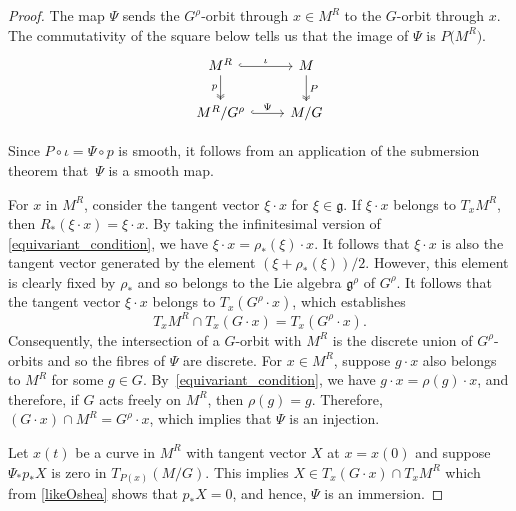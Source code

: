 \documentclass[pdftex]{sigma}
\numberwithin{equation}{section}
\begin{document}
\begin{proof}\samepage
	The map $\Psi$ sends the $G^\rho$-orbit through $x\in M^R$ to the $G$-orbit through $x$. The commutativity of the square below tells us that the image of $\Psi$ is $P\bigl(M^R\bigr)$.
	\begin{equation*}%
			\begin{tikzcd}
				M^R\arrow[r, hook,"\iota"]\arrow[d,two heads,"p"'] & M\arrow[d,two heads, "P"] \\ M^R/G^\rho \arrow[r,hook,"\Psi"] & M/G
			\end{tikzcd}
			\end{equation*}
	
Since $P\circ\iota=\Psi\circ p$ is smooth, it follows from an application of the submersion theorem that~$\Psi$ is a smooth map.
	
For $x$ in $M^R$, consider the tangent vector $\xi\cdot x$ for $\xi\in\mathfrak{g}$. If $\xi\cdot x$ belongs to $T_xM^R$, then $R_*(\xi\cdot x)=\xi\cdot x$. By taking the infinitesimal version of \eqref{equivariant_condition}, we have $\xi\cdot x=\rho_*(\xi)\cdot x$. It follows that $\xi\cdot x$ is also the tangent vector generated by the element $(\xi+\rho_*(\xi))/2$. However, this element is clearly fixed by $\rho_*$ and so belongs to the Lie algebra $\mathfrak{g}^\rho$ of $G^\rho$. It follows that the tangent vector $\xi\cdot x$ belongs to $T_x(G^\rho\cdot x)$, which establishes
	\begin{equation}\label{likeOshea}
		T_xM^R\cap T_x(G\cdot x)=T_x(G^\rho\cdot x).
	\end{equation}
	Consequently, the intersection of a $G$-orbit with $M^R$ is the discrete union of $G^\rho$-orbits and so the fibres of $\Psi$ are discrete. For $x\in M^R$, suppose $g\cdot x$ also belongs to $M^R$ for some $g\in G$. By~\eqref{equivariant_condition}, we have $g\cdot x=\rho(g)\cdot x$, and therefore, if $G$ acts freely on $M^R$, then $\rho(g)=g$. Therefore, $(G\cdot x)\cap M^R=G^\rho\cdot x$, which implies that $\Psi$ is an injection.
	
	Let $x(t)$ be a curve in $M^R$ with tangent vector $X$ at $x=x(0)$ and suppose $\Psi_*p_*X$ is zero in $T_{P(x)}(M/G)$. This implies $X\in T_x(G\cdot x)\cap T_xM^R$ which from \eqref{likeOshea} shows that $p_*X=0$, and hence, $\Psi$ is an immersion.
	

\end{proof}
\end{document}
